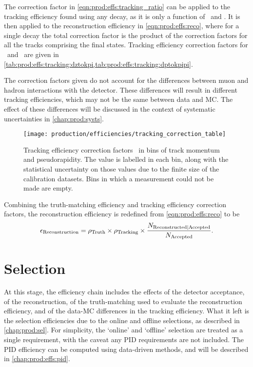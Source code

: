 The correction factor in \cref{eqn:prod:effs:tracking_ratio} can be applied to 
the tracking efficiency found using any decay, as it is only a function of 
\ptot\ and \Eta.
It is then applied to the reconstruction efficiency in 
\cref{eqn:prod:effs:reco}, where for a single decay the total correction factor 
is the product of the correction factors for all the tracks comprising the 
final states.
Tracking efficiency correction factors for \DzToKpi\ and \DpToKpipi\ are given 
in \cref{tab:prod:effs:tracking:dztokpi,tab:prod:effs:tracking:dptokpipi}.

The correction factors given do not account for the differences between muon 
and hadron interactions with the detector.
These differences will result in different tracking efficiencies, which may not 
be the same between data and \ac{MC}.
The effect of these differences will be discussed in the context of systematic 
uncertainties in \cref{chap:prod:systs}.

\begin{figure}
  \centering
  \texttt{[image: production/efficiencies/tracking\_correction\_table]}
  \caption{%
    Tracking efficiency correction factors \efftracking\ in bins of track 
    momentum and pseudorapidity.
    The value is labelled in each bin, along with the statistical uncertainty 
    on those values due to the finite size of the calibration datasets.
    Bins in which a measurement could not be made are empty.
  }
  \label{fig:prod:effs:tracking_table}
\end{figure}

Combining the truth-matching efficiency and tracking efficiency correction 
factors, the reconstruction efficiency is redefined from 
\cref{eqn:prod:effs:reco} to be
\begin{equation}
  \effreco = \efftruth\times\efftracking\times\frac{%
    N_{\text{Reconstructed}|\text{Accepted}}
  }
  {%
    N_{\text{\text{Accepted}}}
  }.
  \label{eqn:prod:effs:reco_corrected}
\end{equation}

\section{Selection}
\label{chap:prod:effs:sel}

At this stage, the efficiency chain includes the effects of the detector 
acceptance, of the reconstruction, of the truth-matching used to evaluate the 
reconstruction efficiency, and of the data-\ac{MC} differences in the tracking 
efficiency.
What it left is the selection efficiencies due to the online and offline 
selections, as described in \cref{chap:prod:sel}.
For simplicity, the `online' and `offline' selection are treated as a single 
requirement, with the caveat any \ac{PID} requirements are not included.
The \ac{PID} efficiency can be computed using data-driven methods, and will be 
described in \cref{chap:prod:effs:pid}.

